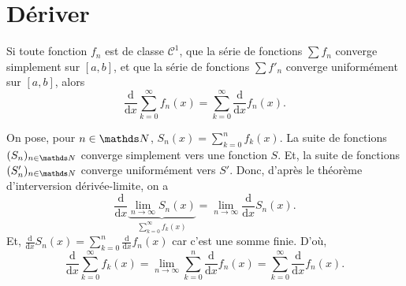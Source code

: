 \section{Dériver}

\begin{thm}
	Si toute fonction $f_n$\/ est de classe $\mathcal{C}^1$, que la série de fonctions $\sum f_n$\/ converge simplement sur $[a,b]$, et que la série de fonctions $\sum f'_n$\/ converge uniformément sur $[a,b]$, alors \[
		\frac{\mathrm{d}}{\mathrm{d}x} \sum_{k=0}^\infty f_n(x) = \sum_{k=0}^\infty \frac{\mathrm{d}}{\mathrm{d}x}f_n(x)
	.\]
\end{thm}

\begin{prv}
	On pose, pour $n \in \N$, $S_n(x) = \sum_{k=0}^n f_k(x)$. La suite de fonctions $(S_n)_{n\in\N}$\/ converge simplement vers une fonction $S$. Et, la suite de fonctions $(S'_n)_{n\in\N}$\/ converge uniformément vers $S'$. Donc, d'après le théorème d'interversion dérivée-limite, on a \[
		\frac{\mathrm{d}}{\mathrm{d}x} \underbrace{\lim_{n\to \infty} S_n(x)}_{\sum_{k=0}^\infty f_k(x)} = \lim_{n\to \infty} \frac{\mathrm{d}}{\mathrm{d}x} S_n(x)
	.\]
	Et, $\frac{\mathrm{d}}{\mathrm{d}x} S_n(x) = \sum_{k=0}^n \frac{\mathrm{d}}{\mathrm{d}x} f_n(x)$\/ car c'est une somme finie. D'où, \[
		\frac{\mathrm{d}}{\mathrm{d}x} \sum_{k=0}^\infty f_k(x) = \lim_{n\to \infty} \sum_{k=0}^n \frac{\mathrm{d}}{\mathrm{d}x} f_n(x) = \sum_{k=0}^\infty \frac{\mathrm{d}}{\mathrm{d}x} f_n(x)
	.\]
\end{prv}


